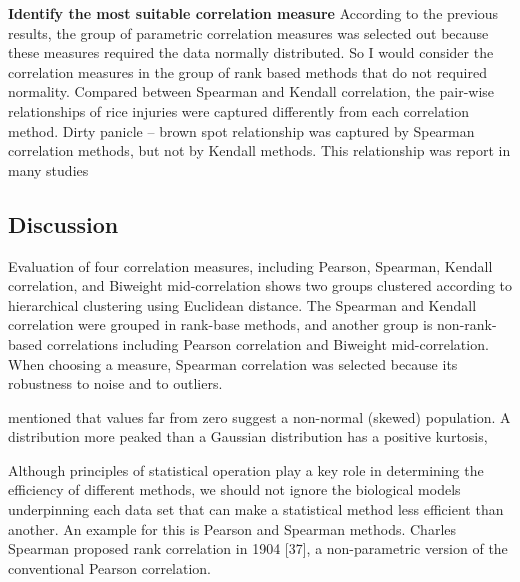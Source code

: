 \textbf{Identify the most suitable correlation measure}
According to the previous results, the group of parametric correlation measures was selected out because these measures required the data normally distributed. So I would consider the correlation measures in the group of rank based methods that do not required normality. Compared between Spearman and Kendall correlation, the pair-wise relationships of rice injuries were captured differently from each correlation method. Dirty panicle – brown spot relationship was captured by Spearman correlation methods, but not by Kendall methods. This relationship was report in many studies \citep{Ou_1985_Rice, Barnwal_2013_Review}


\subsection{Discussion}
Evaluation of four correlation measures, including Pearson, Spearman, Kendall correlation, and Biweight mid-correlation shows two groups clustered according to hierarchical clustering using Euclidean distance. The Spearman and Kendall correlation were grouped in rank-base methods, and another group is non-rank-based correlations including Pearson correlation and Biweight mid-correlation. When choosing a measure, Spearman correlation was selected because its robustness to noise and to outliers.

\citet{Doane_2011_Measuring} mentioned that values far from zero suggest a non-normal (skewed) population.
A distribution more peaked than a Gaussian distribution has a positive kurtosis, 


Although principles of statistical operation play a key role in determining the efficiency of different methods, we should not ignore the biological models underpinning each data set that can make a statistical method less efficient than another. An example for this is Pearson and Spearman methods. Charles Spearman proposed rank correlation in 1904 [37], a non-parametric version of the conventional Pearson correlation. 

